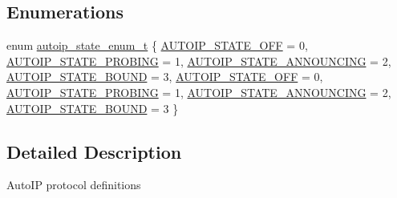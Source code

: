 \subsection*{Enumerations}
\begin{DoxyCompactItemize}
\item 
enum \hyperlink{openmote-cc2538_2lwip_2src_2include_2lwip_2prot_2autoip_8h_a1a27a030b740b1577f95d5aeb54a1a0c}{autoip\+\_\+state\+\_\+enum\+\_\+t} \{ \newline
\hyperlink{native_2lwip_2src_2include_2lwip_2prot_2autoip_8h_a1a27a030b740b1577f95d5aeb54a1a0ca11fa34497b2b043e2a5e7a43323374af}{A\+U\+T\+O\+I\+P\+\_\+\+S\+T\+A\+T\+E\+\_\+\+O\+FF} = 0, 
\hyperlink{native_2lwip_2src_2include_2lwip_2prot_2autoip_8h_a1a27a030b740b1577f95d5aeb54a1a0ca0926fae84a811e23d48115263b8744a3}{A\+U\+T\+O\+I\+P\+\_\+\+S\+T\+A\+T\+E\+\_\+\+P\+R\+O\+B\+I\+NG} = 1, 
\hyperlink{native_2lwip_2src_2include_2lwip_2prot_2autoip_8h_a1a27a030b740b1577f95d5aeb54a1a0cad35142124e3ef9875cb3a9b16209157b}{A\+U\+T\+O\+I\+P\+\_\+\+S\+T\+A\+T\+E\+\_\+\+A\+N\+N\+O\+U\+N\+C\+I\+NG} = 2, 
\hyperlink{native_2lwip_2src_2include_2lwip_2prot_2autoip_8h_a1a27a030b740b1577f95d5aeb54a1a0caa2c50906623e140882d3654c149cca45}{A\+U\+T\+O\+I\+P\+\_\+\+S\+T\+A\+T\+E\+\_\+\+B\+O\+U\+ND} = 3, 
\newline
\hyperlink{openmote-cc2538_2lwip_2src_2include_2lwip_2prot_2autoip_8h_a1a27a030b740b1577f95d5aeb54a1a0ca11fa34497b2b043e2a5e7a43323374af}{A\+U\+T\+O\+I\+P\+\_\+\+S\+T\+A\+T\+E\+\_\+\+O\+FF} = 0, 
\hyperlink{openmote-cc2538_2lwip_2src_2include_2lwip_2prot_2autoip_8h_a1a27a030b740b1577f95d5aeb54a1a0ca0926fae84a811e23d48115263b8744a3}{A\+U\+T\+O\+I\+P\+\_\+\+S\+T\+A\+T\+E\+\_\+\+P\+R\+O\+B\+I\+NG} = 1, 
\hyperlink{openmote-cc2538_2lwip_2src_2include_2lwip_2prot_2autoip_8h_a1a27a030b740b1577f95d5aeb54a1a0cad35142124e3ef9875cb3a9b16209157b}{A\+U\+T\+O\+I\+P\+\_\+\+S\+T\+A\+T\+E\+\_\+\+A\+N\+N\+O\+U\+N\+C\+I\+NG} = 2, 
\hyperlink{openmote-cc2538_2lwip_2src_2include_2lwip_2prot_2autoip_8h_a1a27a030b740b1577f95d5aeb54a1a0caa2c50906623e140882d3654c149cca45}{A\+U\+T\+O\+I\+P\+\_\+\+S\+T\+A\+T\+E\+\_\+\+B\+O\+U\+ND} = 3
 \}
\end{DoxyCompactItemize}


\subsection{Detailed Description}
Auto\+IP protocol definitions 

